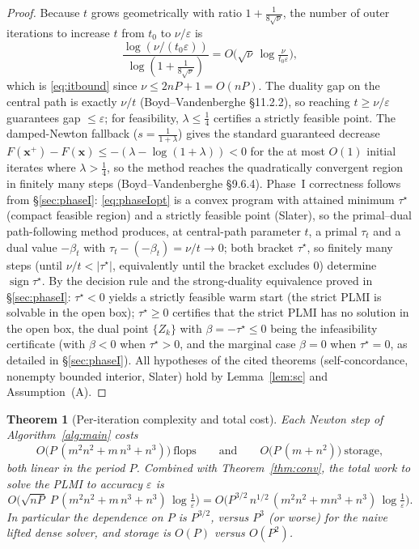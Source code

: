\documentclass{amsart}
\newtheorem{theorem}{Theorem}
\begin{document}
\begin{proof}
Because $t$ grows geometrically with ratio $1+\frac1{8\sqrt\nu}$, the number of outer
iterations to increase $t$ from $t_0$ to $\nu/\varepsilon$ is
\[
  \frac{\log(\nu/(t_0\varepsilon))}{\log(1+\tfrac1{8\sqrt\nu})}
  = O\!\big(\sqrt\nu\,\log\tfrac{\nu}{t_0\varepsilon}\big),
\]
which is \eqref{eq:itbound} since $\nu\le2nP+1=O(nP)$. The duality gap on the central path is
exactly $\nu/t$ (Boyd--Vandenberghe \S11.2.2), so reaching $t\ge\nu/\varepsilon$
guarantees gap $\le\varepsilon$; for feasibility, $\lambda\le\frac14$ certifies a
strictly feasible point. The damped-Newton fallback ($s=\frac1{1+\lambda}$) gives the
standard guaranteed decrease $F(\bm x^+)-F(\bm x)\le-(\lambda-\log(1+\lambda))<0$ for
the at most $O(1)$ initial iterates where $\lambda>\frac14$, so the method reaches the
quadratically convergent region in finitely many steps (Boyd--Vandenberghe \S9.6.4).
Phase~I correctness follows from \S\ref{sec:phaseI}: \eqref{eq:phaseIopt} is a convex
program with attained minimum $\tau^\star$ (compact feasible region) and a strictly
feasible point (Slater), so the primal--dual path-following method produces, at
central-path parameter $t$, a primal $\tau_t$ and a dual value $-\beta_t$ with
$\tau_t-(-\beta_t)=\nu/t\to0$; both bracket $\tau^\star$, so finitely many steps
(until $\nu/t<|\tau^\star|$, equivalently until the bracket excludes $0$) determine
$\operatorname{sign}\tau^\star$. By the decision rule and the strong-duality
equivalence proved in \S\ref{sec:phaseI}: $\tau^\star<0$ yields a strictly feasible
warm start (the strict PLMI is solvable in the open box); $\tau^\star\ge0$ certifies
that the strict PLMI has no solution in the open box, the dual point $\{Z_k\}$ with
$\beta=-\tau^\star\le0$ being the infeasibility certificate (with $\beta<0$ when
$\tau^\star>0$, and the marginal case $\beta=0$ when $\tau^\star=0$, as detailed in
\S\ref{sec:phaseI}). All hypotheses of the cited theorems (self-concordance, nonempty
bounded interior, Slater) hold by Lemma~\ref{lem:sc} and Assumption~(A).
\end{proof}

\begin{theorem}[Per-iteration complexity and total cost]\label{thm:cost}
Each Newton step of Algorithm~\ref{alg:main} costs
\begin{equation}\label{eq:periter}
  O\!\big(P\,(m^2 n^2 + m\,n^3 + n^3)\big)\ \text{flops}
  \qquad\text{and}\qquad
  O\!\big(P\,(m+n^2)\big)\ \text{storage},
\end{equation}
both \emph{linear} in the period $P$. Combined with Theorem~\ref{thm:conv}, the total
work to solve the PLMI to accuracy $\varepsilon$ is
\begin{equation}\label{eq:total}
  O\!\Big(\sqrt{nP}\;P\,(m^2n^2+m\,n^3+n^3)\,\log\tfrac1\varepsilon\Big)
  = O\!\Big(P^{3/2}\,n^{1/2}\,(m^2n^2+mn^3+n^3)\,\log\tfrac1\varepsilon\Big).
\end{equation}
In particular the dependence on $P$ is $P^{3/2}$, versus $P^{3}$ (or worse) for the
naive lifted dense solver, and storage is $O(P)$ versus $O(P^2)$.
\end{theorem}
\end{document}
